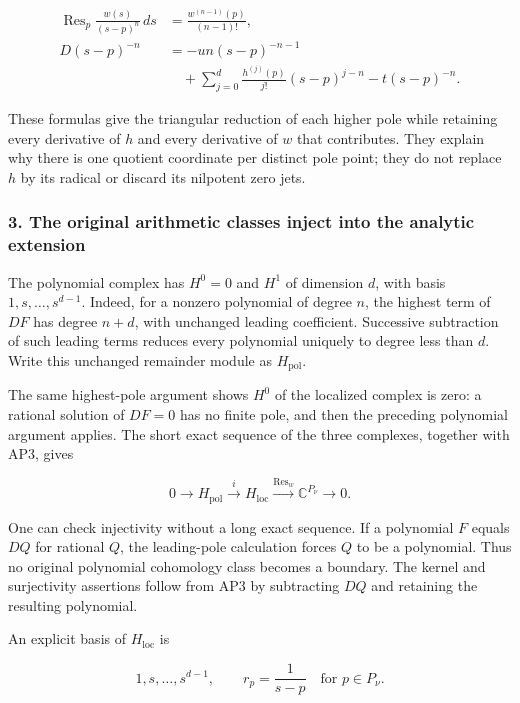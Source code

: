 \[
\begin{aligned}
\operatorname{Res}_p\frac{w(s)}{(s-p)^n}\,ds
&=\frac{w^{(n-1)}(p)}{(n-1)!},\\
D(s-p)^{-n}&=-u n(s-p)^{-n-1}\\
&\quad+\sum_{j=0}^d\frac{h^{(j)}(p)}{j!}(s-p)^{j-n}
-t(s-p)^{-n}.
\end{aligned}
\tag{AP4}
\]

These formulas give the triangular reduction of each higher pole while retaining every derivative of \(h\) and every derivative of \(w\) that contributes. They explain why there is one quotient coordinate per distinct pole point; they do not replace \(h\) by its radical or discard its nilpotent zero jets.

\subsubsection{3. The original arithmetic classes inject into the analytic extension}\label{endpoint-analytic_pole--the-original-arithmetic-classes-inject-into-the-analytic-extension}

The polynomial complex has \(H^0=0\) and \(H^1\) of dimension \(d\), with basis \(1,s,\ldots,s^{d-1}\). Indeed, for a nonzero polynomial of degree \(n\), the highest term of \(DF\) has degree \(n+d\), with unchanged leading coefficient. Successive subtraction of such leading terms reduces every polynomial uniquely to degree less than \(d\). Write this unchanged remainder module as \(H_{\mathrm{pol}}\).

The same highest-pole argument shows \(H^0\) of the localized complex is zero: a rational solution of \(DF=0\) has no finite pole, and then the preceding polynomial argument applies. The short exact sequence of the three complexes, together with AP3, gives

\[
0\longrightarrow H_{\mathrm{pol}}\xrightarrow{i}H_{\mathrm{loc}}
\xrightarrow{\operatorname{Res}_w}\mathbb C^{P_\nu}\longrightarrow0.
\tag{AP5}
\]

One can check injectivity without a long exact sequence. If a polynomial \(F\) equals \(DQ\) for rational \(Q\), the leading-pole calculation forces \(Q\) to be a polynomial. Thus no original polynomial cohomology class becomes a boundary. The kernel and surjectivity assertions follow from AP3 by subtracting \(DQ\) and retaining the resulting polynomial.

An explicit basis of \(H_{\mathrm{loc}}\) is

\[
1,s,\ldots,s^{d-1},\qquad r_p=\frac{1}{s-p}
\quad\text{for }p\in P_\nu.
\tag{AP6}
\]

